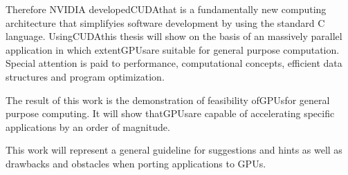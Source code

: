 Therefore NVIDIA developed\gls{CUDA}that is a fundamentally new computing 
architecture that simplifyies software development by using the standard C 
language. Using\gls{CUDA}this thesis will show on the basis of an massively parallel 
application in which extent\glspl{GPU}are suitable for general purpose computation. 
Special attention is paid to performance, computational concepts, efficient data 
structures and program optimization. 

The result of this work is the demonstration of feasibility of\glspl{GPU}for general
purpose computing. It will show that\glspl{GPU}are capable of accelerating specific
applications by an order of magnitude. 

This work will represent a general guideline for suggestions and hints as 
well as drawbacks and obstacles when porting applications to GPUs.

\endgroup			

\vfill